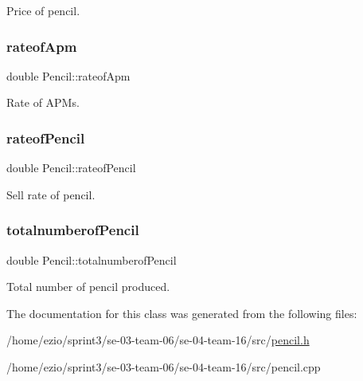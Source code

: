 Price of pencil. \mbox{\label{classPencil_a5b8822d01032897b432fff6ac20d6fb5}} 
\subsubsection{\texorpdfstring{rateof\+Apm}{rateofApm}}
{\footnotesize\ttfamily double Pencil\+::rateof\+Apm}

Rate of A\+P\+Ms. \mbox{\label{classPencil_acc8e87622507eb7d7b6802c561bbf4b5}} 
\subsubsection{\texorpdfstring{rateof\+Pencil}{rateofPencil}}
{\footnotesize\ttfamily double Pencil\+::rateof\+Pencil}

Sell rate of pencil. \mbox{\label{classPencil_a80b094bc36884ba078bc6e07c56871af}} 
\subsubsection{\texorpdfstring{totalnumberof\+Pencil}{totalnumberofPencil}}
{\footnotesize\ttfamily double Pencil\+::totalnumberof\+Pencil}

Total number of pencil produced. 

The documentation for this class was generated from the following files\+:\begin{DoxyCompactItemize}
\item 
/home/ezio/sprint3/se-\/03-\/team-\/06/se-\/04-\/team-\/16/src/\hyperlink{pencil_8h}{pencil.\+h}\item 
/home/ezio/sprint3/se-\/03-\/team-\/06/se-\/04-\/team-\/16/src/pencil.\+cpp\end{DoxyCompactItemize}

